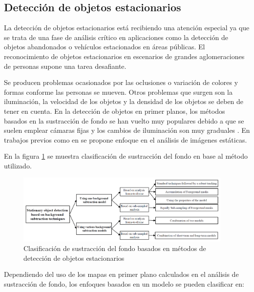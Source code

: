 \subsection{Detección de objetos estacionarios}
\label{subsec:tecnicas-deteccion-obj-estacionarios}

La detección de objetos estacionarios está recibiendo una atención especial ya que se trata de una fase de análisis crítico en aplicaciones como la detección de objetos abandonados o vehículos estacionados en áreas públicas. El reconocimiento de objetos estacionarios en escenarios de grandes aglomeraciones de personas supone una tarea desafiante.

Se producen problemas ocasionados por las oclusiones o variación de colores y formas conforme las personas se mueven. Otros problemas que surgen son la iluminación, la velocidad de los objetos y la densidad de los objetos se deben de tener en cuenta. En la detección de objetos en primer planos, los métodos basados en la sustracción de fondo se han vuelto muy populares debido a que se suelen emplear cámaras fijas y los cambios de iluminación son muy graduales \cite{1217925}. En trabajos previos como en \cite{5279450} se propone enfoque en el análisis de imágenes estáticas.

En la figura \ref{fig:metodos-sustraccion-objeto-estacionario} se muestra clasificación de sustracción del fondo en base al método utilizado.

\begin{figure}[ht]
\centering
\includegraphics[width=0.95\textwidth]{img/chapters/estado-del-arte/metodos-sustraccion-fondo-deteccion-fondo-estacionario.png}
\caption{\label{fig:metodos-sustraccion-objeto-estacionario}Clasificación de sustracción del fondo basados en métodos de detección de objetos estacionarios}
\end{figure}

Dependiendo del uso de los mapas en primer plano calculados en el análisis de sustracción de fondo, los enfoques basados en un modelo se pueden clasificar en:

